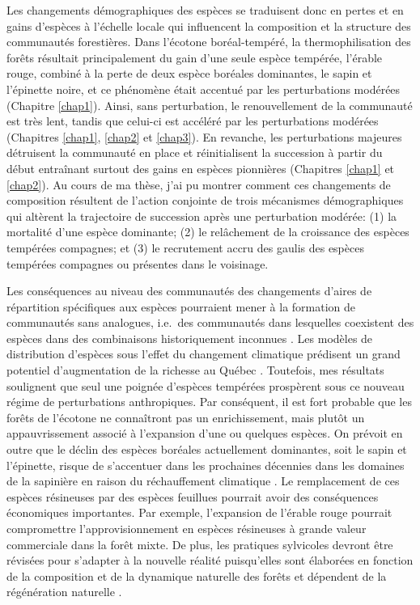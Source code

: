 Les changements démographiques des espèces se traduisent donc en pertes
et en gains d'espèces à l'échelle locale qui influencent la composition
et la structure des communautés forestières. Dans l'écotone
boréal-tempéré, la thermophilisation des forêts résultait principalement
du gain d'une seule espèce tempérée, l'érable rouge, combiné à la perte
de deux espèce boréales dominantes, le sapin et l'épinette noire, et ce
phénomène était accentué par les perturbations modérées (Chapitre
\ref{chap1}). Ainsi, sans perturbation, le renouvellement de la
communauté est très lent, tandis que celui-ci est accéléré par les
perturbations modérées (Chapitres \ref{chap1}, \ref{chap2} et
\ref{chap3}). En revanche, les perturbations majeures détruisent la
communauté en place et réinitialisent la succession à partir du début
entraînant surtout des gains en espèces pionnières (Chapitres
\ref{chap1} et \ref{chap2}). Au cours de ma thèse, j'ai pu montrer
comment ces changements de composition résultent de l'action conjointe
de trois mécanismes démographiques qui altèrent la trajectoire de
succession après une perturbation modérée: (1) la mortalité d'une espèce
dominante; (2) le relâchement de la croissance des espèces tempérées
compagnes; et (3) le recrutement accru des gaulis des espèces tempérées
compagnes ou présentes dans le voisinage.

Les conséquences au niveau des communautés des changements d'aires de
répartition spécifiques aux espèces pourraient mener à la formation de
communautés sans analogues, i.e.~des communautés dans lesquelles
coexistent des espèces dans des combinaisons historiquement inconnues
\citep{williams_novel_2007}. Les modèles de distribution d'espèces sous
l'effet du changement climatique prédisent un grand potentiel
d'augmentation de la richesse au Québec
\citep{berteaux_changements_2014}. Toutefois, mes résultats soulignent
que seul une poignée d'espèces tempérées prospèrent sous ce nouveau
régime de perturbations anthropiques. Par conséquent, il est fort
probable que les forêts de l'écotone ne connaîtront pas un
enrichissement, mais plutôt un appauvrissement associé à l'expansion
d'une ou quelques espèces. On prévoit en outre que le déclin des espèces
boréales actuellement dominantes, soit le sapin et l'épinette, risque de
s'accentuer dans les prochaines décennies dans les domaines de la
sapinière en raison du réchauffement climatique
\citep{dorangeville_beneficial_2018}. Le remplacement de ces espèces
résineuses par des espèces feuillues pourrait avoir des conséquences
économiques importantes. Par exemple, l'expansion de l'érable rouge
pourrait compromettre l'approvisionnement en espèces résineuses à grande
valeur commerciale dans la forêt mixte. De plus, les pratiques
sylvicoles devront être révisées pour s'adapter à la nouvelle réalité
puisqu'elles sont élaborées en fonction de la composition et de la
dynamique naturelle des forêts et dépendent de la régénération naturelle
\citep{pinna_amenagement_2009}.

